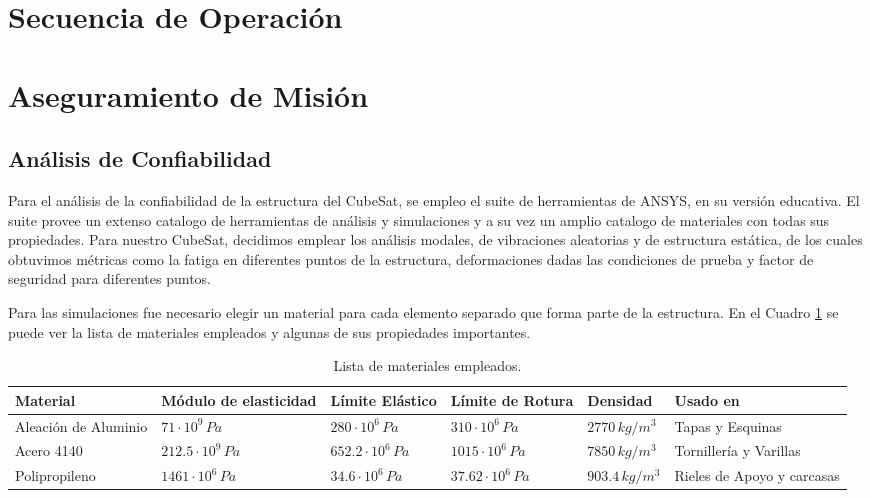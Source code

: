 \section{Secuencia de Operación}

\section{Aseguramiento de Misión}

  \subsection{Análisis de Confiabilidad}
    Para el análisis de la confiabilidad de la estructura del CubeSat, se empleo el suite de
    herramientas de ANSYS, en su versión educativa. El suite provee un extenso catalogo de
    herramientas de análisis y simulaciones y a su vez un amplio catalogo de materiales con
    todas sus propiedades. Para nuestro CubeSat, decidimos emplear los análisis modales, de
    vibraciones aleatorias y de estructura estática, de los cuales obtuvimos métricas como la
    fatiga en diferentes puntos de la estructura, deformaciones dadas las condiciones de prueba
    y factor de seguridad para diferentes puntos.

    Para las simulaciones fue necesario elegir un material para cada elemento separado que
    forma parte de la estructura. En el Cuadro \ref{tab:materiales_empleados} se puede ver la
    lista de materiales empleados y algunas de sus propiedades importantes.

    \begin{table}[H]
    \centering
    \small
    \begin{tabular}{|p{2.2cm}|p{2.3cm}|p{2.3cm}|p{2.5cm}|p{2cm}|p{2.5cm}|}
    \hline
    \textbf{Material} & \centering\textbf{Módulo de elasticidad} & \centering\textbf{Límite Elástico} & \centering\textbf{Límite de Rotura} & \centering\textbf{Densidad} & \centering\textbf{Usado en} \tabularnewline
    \hline
    Aleación de Aluminio & \centering $71 \cdot 10^9\,Pa$ & \centering $280 \cdot 10^6\,Pa$ & \centering $310 \cdot 10^6\,Pa$ & \centering $2770\,kg/m^3$ & Tapas y Esquinas \tabularnewline
    \hline
    Acero 4140 & \centering $212.5 \cdot 10^9\,Pa$ & \centering $652.2 \cdot 10^6\,Pa$ & \centering $1015 \cdot 10^6\,Pa$ & \centering $7850\,kg/m^3$ & Tornillería y Varillas \tabularnewline
    \hline
    Polipropileno & \centering $1461 \cdot 10^6\,Pa$ & \centering $34.6 \cdot 10^6\,Pa$ & \centering $37.62 \cdot 10^6\,Pa$ & \centering $903.4\,kg/m^3$ & Rieles de Apoyo y carcasas \tabularnewline
    \hline
    \end{tabular}
    \caption{Lista de materiales empleados.}
    \label{tab:materiales_empleados}
    \end{table}

